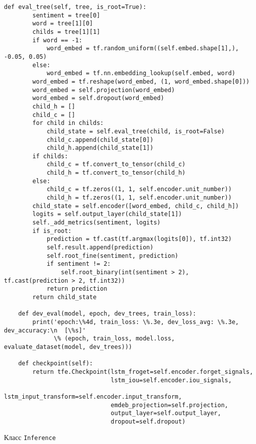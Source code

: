 \begin{lstlisting}[style=app]
    def eval_tree(self, tree, is_root=True):
        sentiment = tree[0]
        word = tree[1][0]
        childs = tree[1][1]
        if word == -1:
            word_embed = tf.random_uniform((self.embed.shape[1],), -0.05, 0.05)
        else:
            word_embed = tf.nn.embedding_lookup(self.embed, word)
        word_embed = tf.reshape(word_embed, (1, word_embed.shape[0]))
        word_embed = self.projection(word_embed)
        word_embed = self.dropout(word_embed)
        child_h = []
        child_c = []
        for child in childs:
            child_state = self.eval_tree(child, is_root=False)
            child_c.append(child_state[0])
            child_h.append(child_state[1])
        if childs:
            child_c = tf.convert_to_tensor(child_c)
            child_h = tf.convert_to_tensor(child_h)
        else:
            child_c = tf.zeros((1, 1, self.encoder.unit_number))
            child_h = tf.zeros((1, 1, self.encoder.unit_number))
        child_state = self.encoder([word_embed, child_c, child_h])
        logits = self.output_layer(child_state[1])
        self._add_metrics(sentiment, logits)
        if is_root:
            prediction = tf.cast(tf.argmax(logits[0]), tf.int32)
            self.result.append(prediction)
            self.root_fine(sentiment, prediction)
            if sentiment != 2:
                self.root_binary(int(sentiment > 2), tf.cast(prediction > 2, tf.int32))
            return prediction
        return child_state

    def dev_eval(model, epoch, dev_trees, train_loss):
        print('epoch:\%4d, train_loss: \%.3e, dev_loss_avg: \%.3e, dev_accuracy:\n  [\%s]'
              \% (epoch, train_loss, model.loss, evaluate_dataset(model, dev_trees)))

    def checkpoint(self):
        return tfe.Checkpoint(lstm_froget=self.encoder.forget_signals,
                              lstm_iou=self.encoder.iou_signals,
                              lstm_input_transform=self.encoder.input_transform,
                              emdeb_projection=self.projection,
                              output_layer=self.output_layer,
                              dropout=self.dropout)

\end{lstlisting}


\begin{center}Класс \texttt{Inference}\end{center}

